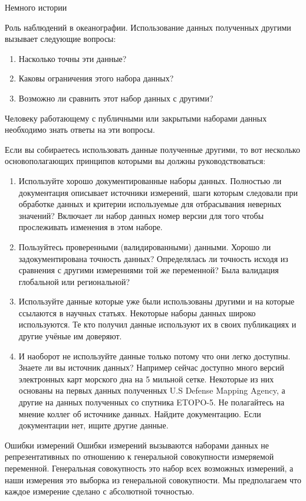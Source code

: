 \begin{chapter}{Немного истории}
\begin{section}{Роль наблюдений в океанографии.}
Использование данных полученных другими вызывает следующие вопросы:
\begin{enumerate}
   \item Насколько точны эти данные?
   \item Каковы ограничения этого набора данных?
   \item Возможно ли сравнить этот набор данных с другими?
\end{enumerate}

Человеку работающему с публичными или закрытыми наборами данных
необходимо знать ответы на эти вопросы.

Если вы собираетесь использовать данные полученные другими, то вот
несколько основополагающих принципов которыми вы должны
руководствоваться:

\begin{enumerate}
\item
Используйте хорошо документированные наборы данных. Полностью ли
документация описывает источники измерений, шаги которым следовали при
обработке данных и критерии используемые для отбрасывания неверных
значений? Включает ли набор данных номер версии для того чтобы
прослеживать изменения в этом наборе.

\item
Пользуйтесь проверенными (валидированными) данными. Хорошо ли
задокументирована точность данных? Определялась ли точность исходя из
сравнения с другими измерениями той же переменной? Была валидация
глобальной или региональной?

\item
Используйте данные которые уже были использованы другими и на которые
ссылаются в научных статьях. Некоторые наборы данных широко
используются. Те кто получил данные используют их в своих публикациях
и другие учёные им доверяют.

\item 
И наоборот не используйте данные только потому что они легко
доступны. Знаете ли вы источник данных? Например сейчас доступно много
версий электронных карт морского дна на 5 мильной сетке. Некоторые из
них основаны на первых данных полученных U.S Defense Mapping Agency, а
другие на данных полученных со спутника ETOPO-5. Не полагайтесь на
мнение коллег об источнике данных. Найдите документацию. Если
документации нет, ищите другие данные.
\end{enumerate}
\end{section}

\begin{section}{Ошибки измерений}
Ошибки измерений вызываются наборами данных не репрезентативных по
отношению к генеральной совокупности измеряемой
переменной. Генеральная совокупность это набор всех возможных
измерений, а наши измерения это выборка из генеральной
совокупности. Мы предполагаем что каждое измерение сделано с
абсолютной точностью.


\end{section}
\end{chapter}
